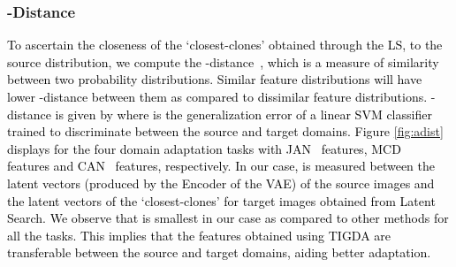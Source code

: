 \documentclass[journal,twoside,web]{IEEEtran}
\newcommand{\bb}{\textcolor{black}}
\begin{document}
\subsubsection{-Distance}
\bb{To ascertain the closeness of the `closest-clones' obtained through the LS, to the source distribution, we compute the -distance~\cite{ben2007analysis}, which is a measure of similarity between two probability distributions. Similar feature distributions will have lower -distance between them as compared to dissimilar feature distributions. -distance is given by  where  is the generalization error  of a linear SVM classifier trained to discriminate between the source and target domains.} \bb{Figure \ref{fig:adist} displays  for the four domain adaptation tasks with JAN~\cite{long2017deep} features, MCD~\cite{saito2018maximum} features and CAN~\cite{kang2019contrastive} features, respectively. In our case,  is measured between the latent vectors (produced by the Encoder of the VAE) of the source images and the latent vectors of the `closest-clones' for target images obtained from Latent Search. We  observe that  is smallest in our case as compared to other methods for all the tasks. This implies that the features obtained using TIGDA are transferable between the source and target domains, aiding better adaptation.}
\end{document}
